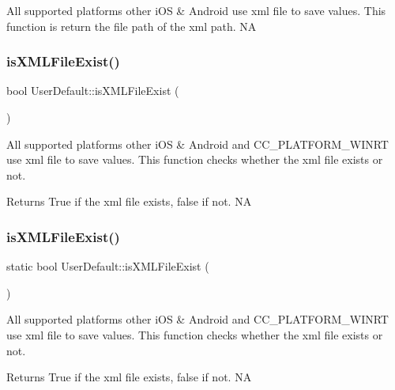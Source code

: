 All supported platforms other i\+OS \& Android use xml file to save values. This function is return the file path of the xml path.  NA \mbox{\label{classUserDefault_a87a36ab9acaabfa2ad0adcf82123e79f}} 
\subsubsection{\texorpdfstring{is\+X\+M\+L\+File\+Exist()}{isXMLFileExist()}\hspace{0.1cm}{\footnotesize\ttfamily [1/2]}}
{\footnotesize\ttfamily bool User\+Default\+::is\+X\+M\+L\+File\+Exist (\begin{DoxyParamCaption}{ }\end{DoxyParamCaption})\hspace{0.3cm}{\ttfamily [static]}}

All supported platforms other i\+OS \& Android and C\+C\+\_\+\+P\+L\+A\+T\+F\+O\+R\+M\+\_\+\+W\+I\+N\+RT use xml file to save values. This function checks whether the xml file exists or not. \begin{DoxyReturn}{Returns}
True if the xml file exists, false if not.  NA 
\end{DoxyReturn}
\mbox{\label{classUserDefault_a0fc15725eba5dc66a2792e3b2bfacb6b}} 
\subsubsection{\texorpdfstring{is\+X\+M\+L\+File\+Exist()}{isXMLFileExist()}\hspace{0.1cm}{\footnotesize\ttfamily [2/2]}}
{\footnotesize\ttfamily static bool User\+Default\+::is\+X\+M\+L\+File\+Exist (\begin{DoxyParamCaption}{ }\end{DoxyParamCaption})\hspace{0.3cm}{\ttfamily [static]}}

All supported platforms other i\+OS \& Android and C\+C\+\_\+\+P\+L\+A\+T\+F\+O\+R\+M\+\_\+\+W\+I\+N\+RT use xml file to save values. This function checks whether the xml file exists or not. \begin{DoxyReturn}{Returns}
True if the xml file exists, false if not.  NA 
\end{DoxyReturn}
\mbox{\label{classUserDefault_adef2a718311ba39ea072abd617e3750c}} 
